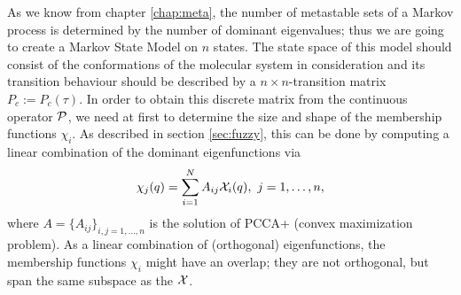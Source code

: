 As we know from chapter \ref{chap:meta}, the number of metastable sets of a Markov process is determined by the number of dominant eigenvalues; thus we are going to create a Markov State Model on $n$ states.
The state space of this model should consist of the conformations of the molecular system in consideration and its transition behaviour should be described by a $n\times n$-transition matrix $P_c := P_c(\tau)$.
In order to obtain this discrete matrix  from the continuous operator $\mathcal{P}$, we need at first to determine the size and shape of the membership functions  $\chi_i$.
As described in section \ref{sec:fuzzy}, this can be done by computing a linear combination of the dominant eigenfunctions via
\begin{equation}
\label{eq:pcca_membership}
\chi_j(q) = \sum_{i=1}^N A_{ij}\mathcal{X}_i(q), \ j=1,\dots,n,
\end{equation}
where $A= \{A_{ij}\}_{i,j=1,\dots,n}$ is the solution of PCCA+ (convex maximization problem).
As a linear combination of (orthogonal) eigenfunctions, the membership functions $\chi_i$ might have an overlap; they are not orthogonal, but span the same subspace as the $\mathcal{X}$.
\\

